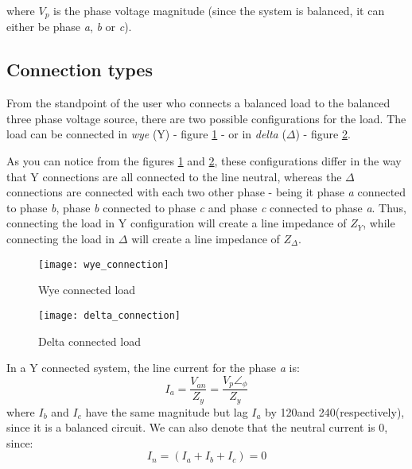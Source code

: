 where $V_{p}$ is the phase voltage magnitude (since the system is balanced, it can either be phase \emph{a}, \emph{b} or \emph{c}).

\subsection{Connection types}

From the standpoint of the user who connects a balanced load to the balanced three phase voltage source, there are two possible configurations for the load. The load can be connected in \emph{wye} (Y) - figure \ref{fig:wye_connected_load} -  or in \emph{delta} ($\Delta$) - figure \ref{fig:delta_connected_load}.

As you can notice from the figures \ref{fig:wye_connected_load} and \ref{fig:delta_connected_load}, these configurations differ in the way that Y connections are all connected to the line neutral, whereas the $\Delta$ connections are connected with each two other phase - being it phase \emph{a} connected to phase \emph{b}, phase \emph{b} connected to phase \emph{c} and phase \emph{c} connected to phase \emph{a}. Thus, connecting the load in Y configuration will create a line impedance of $Z_{Y}$, while connecting the load in $\Delta$ will create a line impedance of $Z_{\Delta}$.

\begin{figure}[htbp]
	\centering
	\texttt{[image: wye\_connection]}
	\caption{Wye connected load}
	\label{fig:wye_connected_load}
\end{figure}

\begin{figure}[htbp]
	\centering
	\texttt{[image: delta\_connection]}
	\caption{Delta connected load}
	\label{fig:delta_connected_load}
\end{figure}

In a Y connected system, the line current for the phase \emph{a} is:
\begin{equation} \label{eq:balanced_tpIa}
	I_{a} = \frac{V_{an}}{Z_{y}} = \frac{V_{p}\angle_{\phi}}{Z_{y}}
\end{equation}
where $I_{b}$ and $I_{c}$ have the same magnitude but lag $I_{a}$ by 120\degree and 240\degree (respectively), since it is a balanced circuit. We can also denote that the neutral current is 0, since:
\begin{equation} \label{eq:balanced_tpIn}
	I_{n} = (I_{a} + I_{b} + I_{c}) = 0
\end{equation}


